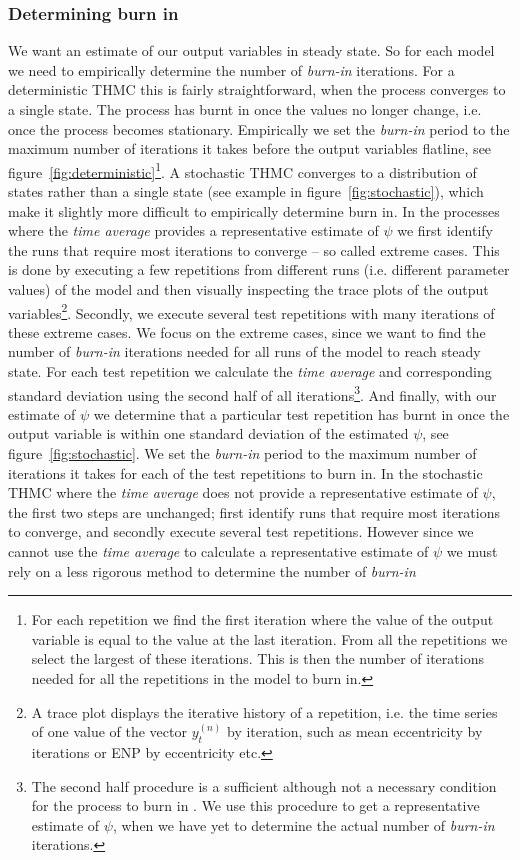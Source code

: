 \documentclass[preprint, 12pt]{elsarticle}
\begin{document}
\subsubsection{Determining burn in}

We want an estimate of our output variables in steady state. So for each model we need to empirically determine the number of \emph{burn-in} iterations. For a deterministic THMC this is fairly straightforward, when the process converges to a single state. The process has burnt in once the values no longer change, i.e. once the process becomes stationary. Empirically we set the \emph{burn-in} period to the maximum number of iterations it takes before the output variables flatline, see figure~\ref{fig:deterministic}\footnote{For each repetition we find the first iteration where the value of the output variable is equal to the value at the last iteration. From all the repetitions we select the largest of these iterations. This is then the number of iterations needed for all the repetitions in the model to burn in.}. A stochastic THMC converges to a distribution of states rather than a single state (see example in figure~\ref{fig:stochastic}), which make it slightly more difficult to empirically determine burn in. In the processes where the \emph{time average} provides a representative estimate of $\psi$ we first identify the runs that require most iterations to converge -- so called extreme cases. This is done by executing a few repetitions from different runs (i.e. different parameter values) of the model and then visually inspecting the trace plots of the output variables\footnote{A trace plot displays the iterative history of a repetition, i.e. the time series of one value of the vector $y_t^{(n)}$ by iteration, such as mean eccentricity by iterations or ENP by eccentricity etc.}. Secondly, we execute several test repetitions with many iterations of these extreme cases. We focus on the extreme cases, since we want to find the number of \emph{burn-in} iterations needed for all runs of the model to reach steady state. For each test repetition we calculate the \emph{time average} and corresponding standard deviation using the second half of all iterations\footnote{The second half procedure is a sufficient although not a necessary condition for the process to burn in \citep[chapter~4, p.~73]{Laver_Sergenti_2011}. We use this procedure to get a representative estimate of $\psi$, when we have yet to determine the actual number of \emph{burn-in} iterations.}. And finally, with our estimate of $\psi$ we determine that a particular test repetition has burnt in once the output variable is within one standard deviation of the estimated $\psi$, see figure~\ref{fig:stochastic}. We set the \emph{burn-in} period to the maximum number of iterations it takes for each of the test repetitions to burn in. In the stochastic THMC where the \emph{time average} does not provide a representative estimate of $\psi$, the first two steps are unchanged; first identify runs that require most iterations to converge, and secondly execute several test repetitions. However since we cannot use the \emph{time average} to calculate a representative estimate of $\psi$ we must rely on a less rigorous method to determine the number of \emph{burn-in} 
\end{document}
